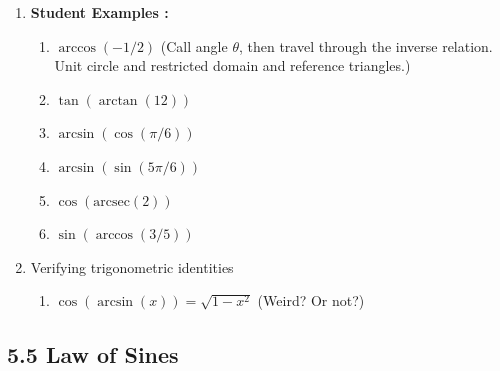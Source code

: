 \documentclass{article}
\begin{document}
\begin{enumerate}
\item {\bf Student Examples :}
\begin{enumerate}
\item $\arccos(-1/2)$ (Call angle $\theta$, then travel through the inverse relation. Unit circle and restricted domain and reference triangles.)
\item $\tan(\arctan(12))$
\item $\arcsin(\cos(\pi/6))$
\item $\arcsin(\sin(5\pi/6))$
\item $\cos(\text{arcsec}(2))$
\item $\sin(\arccos(3/5))$
\end{enumerate}

\item Verifying trigonometric identities
\begin{enumerate}
\item $\cos(\arcsin(x)) = \sqrt{1-x^2}$ (Weird? Or not?)
\end{enumerate}
\end{enumerate}


\subsection{5.5 Law of Sines}
\end{document}
